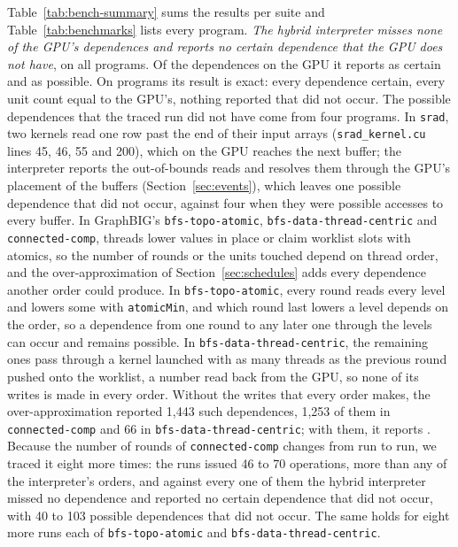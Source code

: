 \documentclass[11pt]{article}
\newcommand{\secref}[1]{Section~\ref{#1}}
\newcommand{\tabref}[1]{Table~\ref{#1}}
\newcommand{\code}[1]{\texttt{#1}}
\begin{document}
\tabref{tab:bench-summary} sums the results per suite and \tabref{tab:benchmarks} lists every program.
\textit{The hybrid interpreter misses none of the GPU's dependences and reports no certain dependence that the GPU
does not have}, on all \numBenchHyDone{} programs. Of the \numBenchHyTruth{} dependences on the GPU it
reports \numBenchHyCertTP{} as certain and \numBenchHyPossYes{} as possible. On \numBenchHyExact{} programs its result
is exact: every dependence certain, every unit count equal to the GPU's, nothing reported that did not occur. The
\numBenchHyPossNo{} possible dependences that the traced run did not have come from four programs. In \code{srad},
two kernels read one row past the end of their input arrays (\code{srad\_kernel.cu} lines 45, 46, 55 and 200), which
on the GPU reaches the next buffer; the interpreter reports the out-of-bounds reads and resolves them through the
GPU's placement of the buffers (\secref{sec:events}), which leaves one possible dependence that did not occur,
against four when they were possible accesses to every buffer. In GraphBIG's \code{bfs-topo-atomic}, \code{bfs-data-thread-centric} and \code{connected-comp},
threads lower values in place or claim worklist slots with atomics, so the number of rounds or the units touched
depend on thread order, and the over-approximation of \secref{sec:schedules} adds every dependence another order
could produce. In \code{bfs-topo-atomic}, every round reads every level and lowers some with \code{atomicMin}, and
which round last lowers a level depends on the order, so a dependence from one round to any later one through the
levels can occur and remains possible. In \code{bfs-data-thread-centric}, the remaining ones pass through a kernel
launched with as many threads as the previous round pushed onto the worklist, a number read back from the GPU, so
none of its writes is made in every order.
Without the writes that every order makes, the over-approximation reported 1{,}443 such dependences, 1{,}253 of
them in \code{connected-comp} and 66 in \code{bfs-data-thread-centric}; with them, it reports \numBenchHyPossNo{}. Because the number of rounds of
\code{connected-comp} changes from run to run, we traced it eight more times: the runs issued 46 to 70
operations, more than any of the interpreter's orders, and against every one of them the hybrid interpreter missed
no dependence and reported no certain dependence that did not occur, with 40 to 103 possible dependences that did
not occur. The same holds for eight more runs each of \code{bfs-topo-atomic} and \code{bfs-data-thread-centric}.
\end{document}
